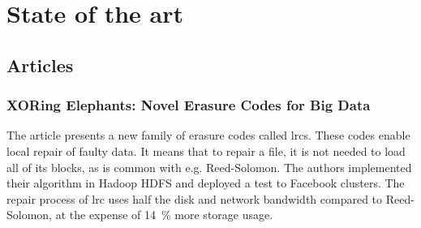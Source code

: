 \chapter{State of the art}

\section{Articles}

\subsection{XORing Elephants: Novel Erasure Codes for Big Data \autocite{XorbasVLDB}}

The article presents a new family of erasure codes called \acp{lrc}.
These codes enable local repair of faulty data.
It means that to repair a file, it is not needed to load all of its blocks, as is common with e.g. Reed-Solomon.
The authors implemented their algorithm in Hadoop HDFS and deployed a test to Facebook clusters.
The repair process of \ac{lrc} uses half the disk and network bandwidth compared to Reed-Solomon, at the expense of \SI{14}{\percent} more storage usage.
